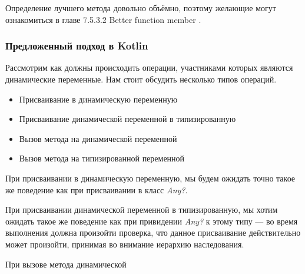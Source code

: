 Определение лучшего метода довольно объёмно, поэтому желающие могут ознакомиться в главе 7.5.3.2 Better function member \cite{csharp:languageSpecification}.


\subsubsection{Предложенный подход в Kotlin}

Рассмотрим как должны происходить операции, участниками которых являются динамические переменные. Нам стоит обсудить несколько типов операций.
\begin{itemize}
    \item Присваивание в динамическую переменную
    \item Присваивание динамической переменной в типизированную
    \item Вызов метода на динамической переменной
    \item Вызов метода на типизированной переменной
\end{itemize}

При присваивании в динамическую переменную, мы будем ожидать точно такое же поведение как при присваивании в класс \textit{Any?}.

При присваивании динамической переменной в типизированную, мы хотим ожидать такое же поведение как при привидении \textit{Any?} к этому типу --- во время выполнения должна произойти проверка, что данное присваивание действительно может произойти, принимая во внимание иерархию наследования.

При вызове метода динамической 